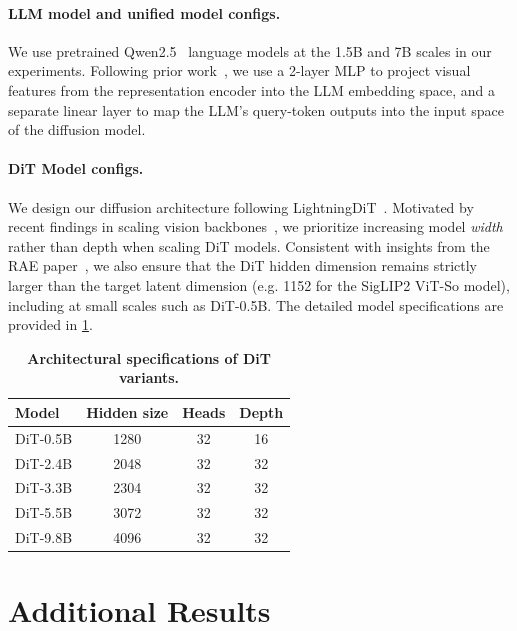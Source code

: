 \documentclass[10pt,twocolumn,letterpaper]{article}
\begin{document}
\paragraph{LLM model and unified model configs.} We use pretrained Qwen2.5~\citep{qwen2024qwen2} language models at the 1.5B and 7B scales in our experiments. Following prior work~\citep{liu2023visual,tong2024cambrian}, we use a 2-layer MLP to project visual features from the representation encoder into the LLM embedding space, and a separate linear layer to map the LLM’s query-token outputs into the input space of the diffusion model.



\paragraph{DiT Model configs.}
We design our diffusion architecture following LightningDiT~\citep{lgt}. Motivated by recent findings in scaling vision backbones~\citep{fan2025scaling, wan2025wan, dehghani2023scaling}, we prioritize increasing model \emph{width} rather than depth when scaling DiT models. Consistent with insights from the RAE paper~\citep{zheng2025diffusion}, we also ensure that the DiT hidden dimension remains strictly larger than the target latent dimension (e.g. 1152 for the SigLIP2 ViT-So model), including at small scales such as DiT-0.5B. The detailed model specifications are provided in \cref{tab:diffusion model spec}.

\begin{table}[h]
\centering
\small
\begin{tabular}{lccc}
\toprule
Model & Hidden size & Heads & Depth \\
\midrule
DiT-0.5B & 1280  & 32 & 16 \\
DiT-2.4B & 2048  & 32 & 32 \\
DiT-3.3B & 2304 & 32 & 32 \\
DiT-5.5B & 3072  & 32 & 32 \\
DiT-9.8B & 4096  & 32 & 32 \\
\bottomrule
\end{tabular}
\caption{\textbf{Architectural specifications of DiT variants.}}
\label{tab:diffusion model spec}
\end{table}

\section{Additional Results}\label{appendix: additional results}
\end{document}
